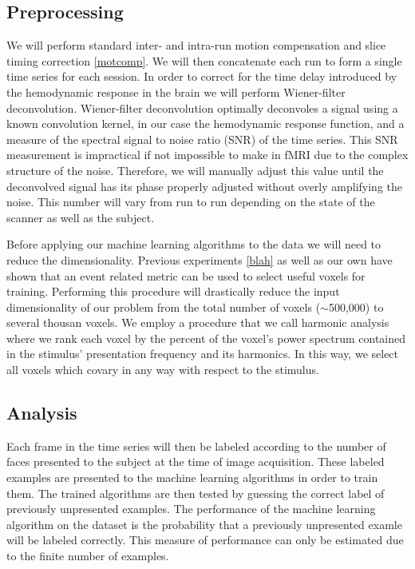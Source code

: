 \documentclass[12pt]{article}
\begin{document}
\subsection{Preprocessing}
We will perform standard inter- and intra-run motion compensation and slice timing correction \ref{motcomp}.
We will then concatenate each run to form a single time series for each session.
In order to correct for the time delay introduced by the hemodynamic response in the brain we will perform Wiener-filter deconvolution.
Wiener-filter deconvolution optimally deconvoles a signal using a known convolution kernel, in our case the hemodynamic response function, and a measure of the spectral signal to noise ratio (SNR) of the time series.
This SNR measurement is impractical if not impossible to make in fMRI due to the complex structure of the noise.
Therefore, we will manually adjust this value until the deconvolved signal has its phase properly adjusted without overly amplifying the noise.
This number will vary from run to run depending on the state of the scanner as well as the subject.

Before applying our machine learning algorithms to the data we will need to reduce the dimensionality.
Previous experiments \ref{blah} as well as our own have shown that an event related metric can be used to select useful voxels for training.
Performing this procedure will drastically reduce the input dimensionality of our problem from the total number of voxels ($\sim$500,000) to several thousan voxels.
We employ a procedure that we call harmonic analysis where we rank each voxel by the percent of the voxel's power spectrum contained in the stimulus' presentation frequency and its harmonics.
In this way, we select all voxels which covary in any way with respect to the stimulus.

\subsection{Analysis}


Each frame in the time series will then be labeled according to the number of faces presented to the subject at the time of image acquisition.
These labeled examples are presented to the machine learning algorithms in order to train them.
The trained algorithms are then tested by guessing the correct label of previously unpresented examples.
The performance of the machine learning algorithm on the dataset is the probability that a previously unpresented examle will be labeled correctly.
This measure of performance can only be estimated due to the finite number of examples.
\end{document}
